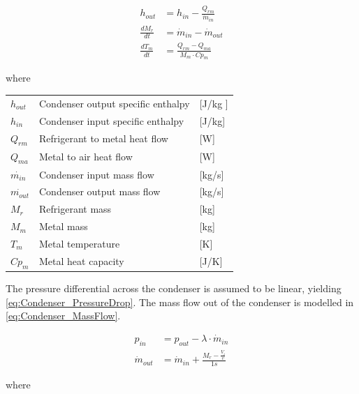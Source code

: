 \begin{align}
	h_{out} 			& = h_{in} - \frac{Q_{rm}}{\dot{m}_{in}}  	\label{eq:Condenser_Enthalpy} \\
	\frac{dM_r}{dt} 	& = \dot{m}_{in} - \dot{m}_{out} 				\label{eq:Condenser_ChangeOfMass}\\
	\frac{dT_m}{dt} 	& = \frac{Q_{rm} - Q_{ma}}{M_m \cdot Cp_m}		\label{eq:Condenser_ChangeOfTemperature}
\end{align}

where 

\begin{center}
	\begin{tabular}{l p{8cm} l}
		$h_{out}$				&  Condenser output specific enthalpy			& [\si{J}/\si{kg} ]\\
		$h_{in}$					&  Condenser input specific enthalpy 			& [\si{J}/\si{kg}] \\
		$Q_{rm}$					& Refrigerant to metal heat flow 			& [\si{W}] \\
		$Q_{ma}$					& Metal to air heat flow						& [\si{W}] \\
		$\dot{m_{in}}$			& Condenser input mass flow 			& [\si{kg}/\si{s}] \\
		$\dot{m_{out}}$			& Condenser output mass flow 		& [\si{kg}/\si{s}] \\
		$M_r$						& Refrigerant mass 								& [\si{kg}] \\
		$M_m$						& Metal mass												& [\si{kg}] \\
		$T_m$						& Metal temperature 							& [\si{K}]\\
		$Cp_m$					& Metal heat capacity 						& [\si{J}/\si{K}]\\
	\end{tabular}
\end{center}

The pressure differential across the condenser is assumed to be linear, yielding \cref{eq:Condenser_PressureDrop}.
The mass flow out of the condenser is modelled in \cref{eq:Condenser_MassFlow}.


\begin{align}
	p_{in}	 			& = p_{out} - \lambda \cdot \dot{m}_{in}  				\label{eq:Condenser_PressureDrop}\\
	\dot{m}_{out}		& = \dot{m}_{in} + \frac{M_r - \frac{V_i}{v}}{1s}		\label{eq:Condenser_MassFlow}
\end{align}

where 

